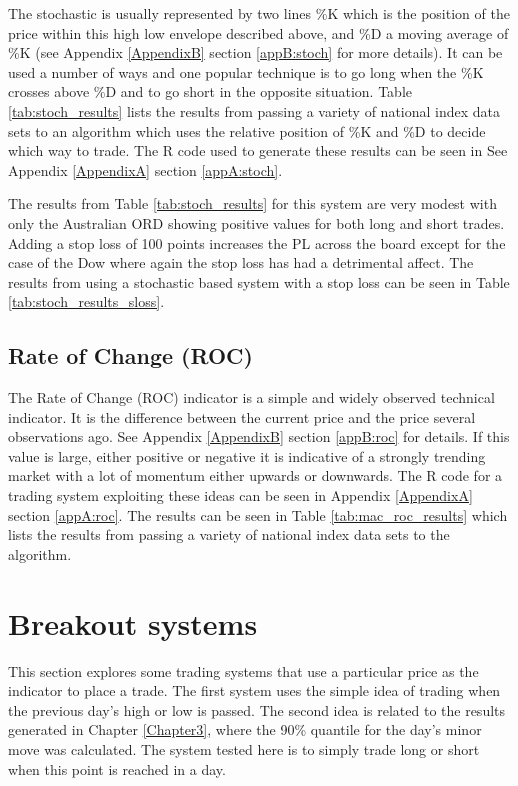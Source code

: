 The stochastic is usually represented by two lines \%K which is the position of the price within this high low envelope described above, and \%D a moving average of \%K (see Appendix \ref{AppendixB} section \ref{appB:stoch} for more details). It can be used a number of ways and one popular technique is to go long when the \%K crosses above \%D and to go short in the opposite situation. Table \ref{tab:stoch_results} lists the results from passing a variety of national index data sets to an algorithm which uses the relative position of \%K and \%D to decide which way to trade. The R code used to generate these results can be seen in See Appendix \ref{AppendixA} section \ref{appA:stoch}.



The results from Table \ref{tab:stoch_results} for this system are very modest with only the Australian ORD showing positive values for both long and short trades. Adding a stop loss of 100 points increases the PL across the board except for the case of the Dow where again the stop loss has had a detrimental affect. The results from using a stochastic based system with a stop loss can be seen in Table \ref{tab:stoch_results_sloss}.


 
\subsection{Rate of Change (ROC)}
The Rate of Change (ROC) indicator is a simple and widely observed technical indicator. It is the difference between the current price and the price several observations ago. See Appendix \ref{AppendixB} section \ref{appB:roc} for details. If this value is large, either positive or negative it is indicative of a strongly trending market with a lot of momentum either upwards or downwards. The R code for a trading system exploiting these ideas can be seen in Appendix \ref{AppendixA} section \ref{appA:roc}. The results can be seen in Table \ref{tab:mac_roc_results} which lists the results from passing a variety of national index data sets to the algorithm.



%

\section{Breakout systems}
\label{sec:bout}
This section explores some trading systems that use a particular price as the indicator to place a trade. The first system uses the simple idea of trading when the previous day's high or low is passed. The second idea is related to the results generated in Chapter \ref{Chapter3}, where the 90\% quantile for the day's minor move was calculated. The system tested here is to simply trade long or short when this point is reached in a day.

